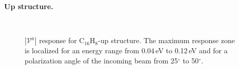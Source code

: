 \documentclass[prb,11pt,tightenlines,twocolumn,aps]{revtex4-1}
\begin{document}

\textbf{Up structure.}

\begin{figure}[t]
    \centering
    \\
    \caption{$|\mathcal{V}^{\mathrm{x}}|$ response for C$_{16}$H$_{8}$-up
    structure. The maximum response zone is localized for an energy range from
    0.04\,eV to 0.12\,eV and for a polarization angle of the
    incoming beam from 25$^{\circ}$ to 50$^{\circ}$.}
    \label{fig:up-3d-1}
\end{figure}
\end{document}
